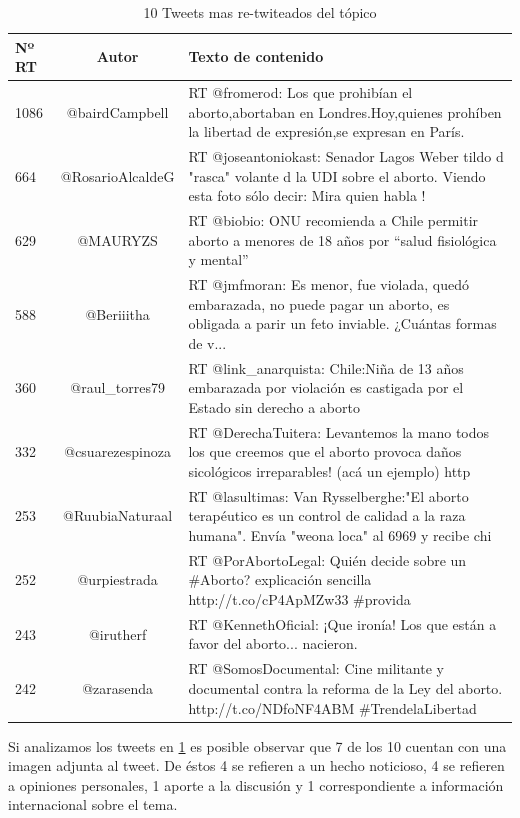 \begin{table}[H]
	\centering
	\begin{tabular}{| l | c | p{10cm} |}
		\hline
		Nº RT    & Autor & Texto de contenido\\ \hline
		1086  & @bairdCampbell & RT @fromerod: Los que prohibían el aborto,abortaban en  Londres.Hoy,quienes prohíben la libertad de expresión,se expresan en París. \\ \hline
		664  & @RosarioAlcaldeG & RT @joseantoniokast: Senador Lagos Weber tildo d "rasca" volante d la UDI sobre el aborto. Viendo esta foto sólo decir: Mira quien habla !  \\ \hline
		629  & @MAURYZS & RT @biobio: ONU recomienda a Chile permitir aborto a menores de 18 años por “salud fisiológica y mental” \\ \hline
		588  & @Beriiitha & RT @jmfmoran: Es menor, fue violada, quedó embarazada, no puede pagar un aborto, es obligada a parir un feto inviable. ¿Cuántas formas de v... \\ \hline
		360  & @raul\_torres79 & RT @link\_anarquista: Chile:Niña de 13 años embarazada por violación es castigada por el Estado sin derecho a aborto \\ \hline
		332  & @csuarezespinoza & RT @DerechaTuitera: Levantemos la mano todos los que creemos que el aborto provoca daños sicológicos irreparables! (acá un ejemplo) http \\ \hline
		253  & @RuubiaNaturaal & RT @lasultimas: Van Rysselberghe:"El aborto terapéutico es un control de calidad a la raza humana". Envía "weona loca" al 6969 y recibe chi \\ \hline
		252  & @urpiestrada & RT @PorAbortoLegal: Quién decide sobre un \#Aborto? explicación sencilla  http://t.co/cP4ApMZw33 \#provida \\ \hline
		243  & @irutherf & RT @KennethOficial: ¡Que ironía! Los que están a favor del aborto... nacieron. \\ \hline
		242  & @zarasenda & RT @SomosDocumental: Cine militante y documental contra la reforma de la Ley del aborto. http://t.co/NDfoNF4ABM \#TrendelaLibertad \\ \hline
	\end{tabular}
	\caption {10 Tweets mas re-twiteados del tópico}
	\label{table:123_topten_rt}
\end{table}

Si analizamos los tweets en \ref{table:123_topten_rt} es posible observar que 7 de los 10 cuentan con una imagen adjunta al tweet. De éstos 4 se refieren a un hecho noticioso, 4 se refieren a opiniones personales, 1 aporte a la discusión y 1 correspondiente a información internacional sobre el tema. 

